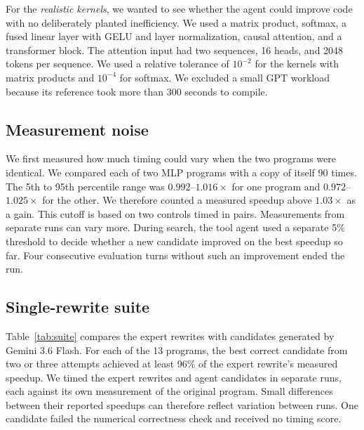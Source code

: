 \documentclass[conference]{IEEEtran}
\begin{document}
For the \emph{realistic kernels}, we wanted to see whether the agent
could improve code with no deliberately planted inefficiency. We used a
matrix product, softmax, a fused linear layer with GELU and layer
normalization, causal attention, and a transformer block. The attention
input had two sequences, 16 heads, and 2048 tokens per sequence. We used
a relative tolerance of $10^{-2}$ for the kernels with matrix products
and $10^{-4}$ for softmax. We excluded a small GPT workload because its
reference took more than 300 seconds to compile.

\subsection{Measurement noise}

We first measured how much timing could vary when the two programs were
identical. We compared each of two MLP programs with a copy of itself
90 times. The 5th to 95th percentile range was $0.992$--$1.016\times$
for one program and $0.972$--$1.025\times$ for the other. We therefore
counted a measured speedup above $1.03\times$ as a gain. This cutoff is
based on two controls timed in pairs. Measurements from separate runs
can vary more. During search, the tool agent used a separate 5\% threshold
to decide whether a new candidate improved on the best speedup so far.
Four consecutive evaluation turns without such an improvement ended the run.

\subsection{Single-rewrite suite}
\label{sec:suite}

Table~\ref{tab:suite} compares the expert rewrites with candidates
generated by Gemini 3.6 Flash. For each of the 13 programs, the best
correct candidate from two or three attempts achieved at least 96\% of
the expert rewrite's measured speedup. We timed the expert rewrites and
agent candidates in separate runs, each against its own measurement of
the original program. Small differences between their reported speedups
can therefore reflect variation between runs. One candidate failed the
numerical correctness check and received no timing score.
\end{document}
